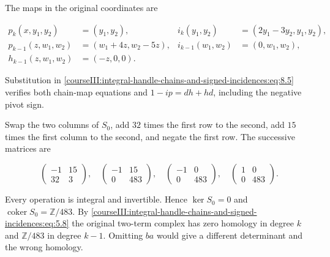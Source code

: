 The maps in the original coordinates are

\begin{equation}
\begin{aligned}
 p_k(x,y_1,y_2)&=(y_1,y_2),&
 i_k(y_1,y_2)&=(2y_1-3y_2,y_1,y_2),\\
 p_{k-1}(z,w_1,w_2)&=(w_1+4z,w_2-5z),&
 i_{k-1}(w_1,w_2)&=(0,w_1,w_2),\\
 h_{k-1}(z,w_1,w_2)&=(-z,0,0).
 \end{aligned}
 \label{courseIII:integral-handle-chains-and-signed-incidences:eq:8.8}
\end{equation}

Substitution in \eqref{courseIII:integral-handle-chains-and-signed-incidences:eq:8.5} verifies both chain-map equations and \(1-ip=dh+hd\), including the negative pivot sign.

Swap the two columns of \(S_0\), add \(32\) times the first row to the second, add \(15\) times the first column to the second, and negate the first row. The successive matrices are

\begin{equation}
\begin{pmatrix}-1&15\\32&3\end{pmatrix},\quad
 \begin{pmatrix}-1&15\\0&483\end{pmatrix},\quad
 \begin{pmatrix}-1&0\\0&483\end{pmatrix},\quad
 \begin{pmatrix}1&0\\0&483\end{pmatrix}.
 \label{courseIII:integral-handle-chains-and-signed-incidences:eq:8.9}
\end{equation}

Every operation is integral and invertible. Hence \(\ker S_0=0\) and \(\operatorname{coker}S_0=\mathbb Z/483\). By \eqref{courseIII:integral-handle-chains-and-signed-incidences:eq:5.8} the original two-term complex has zero homology in degree \(k\) and \(\mathbb Z/483\) in degree \(k-1\). Omitting \(ba\) would give a different determinant and the wrong homology.
